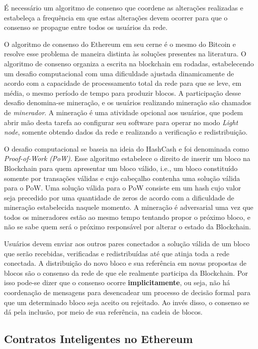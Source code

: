 \documentclass[a4paper,11pt]{article}
\begin{document}
É necessário um algoritmo de consenso que coordene as alterações realizadas e estabeleça a frequência em que estas alterações devem ocorrer para que o consenso se propague entre todos os usuários da rede.

O algoritmo de consenso do Ethereum em seu cerne é o mesmo do Bitcoin e resolve esse problema de maneira distinta às soluções presentes na literatura.
O algoritmo de consenso organiza a escrita na blockchain em rodadas, estabelecendo um desafio computacional com uma dificuldade ajustada dinamicamente de acordo com a capacidade de processamento total da rede para que se leve, em média, o mesmo período de tempo para produzir blocos.
A participação desse desafio denomina-se mineração, e os usuários realizando mineração são chamados de \emph{minerador}.
A mineração é uma atividade opcional aos usuários, que podem abrir mão desta tarefa ao configurar seu software para operar no modo \emph{Light node}, somente obtendo dados da rede e realizando a verificação e redistribuição.

O desafio computacional se baseia na ideia do HashCash \cite{Back2002} e foi denominada como \emph{Proof-of-Work} \emph{(PoW)}.
Esse algoritmo estabelece o direito de inserir um bloco na Blockchain para quem apresentar um bloco válido, i.e., um bloco constituído somente por transações válidas e cujo cabeçalho contenha uma solução válida para o PoW.
Uma solução válida para o PoW consiste em um hash cujo valor seja precedido por uma quantidade de zeros de acordo com a dificuldade de mineração estabelecida naquele momento.
A mineração é adversarial uma vez que todos os mineradores estão ao mesmo tempo tentando propor o próximo bloco, e não se sabe quem será o próximo responsável por alterar o estado da Blockchain.

Usuários devem enviar aos outros pares conectados a solução válida de um bloco que serão recebidas, verificadas e redistribuídas até que atinja toda a rede conectada.
A distribuição do novo bloco e sua referência em novas propostas de blocos são o consenso da rede de que ele realmente participa da Blockchain.
Por isso pode-se dizer que o consenso ocorre \textbf{implicitamente}, ou seja, não há coordenação de mensagens para desencadear um processo de decisão formal para que um determinado bloco seja aceito ou rejeitado.
Ao invés disso, o consenso se dá pela inclusão, por meio de sua referência, na cadeia de blocos.

\subsection{Contratos Inteligentes no Ethereum} \label{sec:sub:contratos-ethereum}
\end{document}
